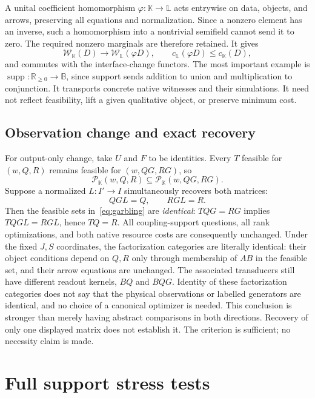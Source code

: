\documentclass[11pt]{article}
\newcommand{\K}{\mathbb K}
\newcommand{\B}{\mathbb B}
\newcommand{\R}{\mathbb R}
\newcommand{\supp}{\operatorname{supp}}
\newcommand{\W}{\mathcal W}
\newcommand{\Pcal}{\mathcal P}
\theoremstyle{remark}
\begin{document}
A unital coefficient homomorphism $\varphi:\K\to\mathbb L$ acts entrywise on data, objects, and arrows, preserving all equations and normalization. Since a nonzero element has an inverse, such a homomorphism into a nontrivial semifield cannot send it to zero. The required nonzero marginals are therefore retained. It gives
\[
 \W_\K(D)\longrightarrow\W_{\mathbb L}(\varphi D),
 \qquad c_{\mathbb L}(\varphi D)\le c_\K(D),
\]
and commutes with the interface-change functors. The most important example is $\supp:\R_{\ge0}\to\B$, since support sends addition to union and multiplication to conjunction. It transports concrete native witnesses and their simulations. It need not reflect feasibility, lift a given qualitative object, or preserve minimum cost.

\subsection{Observation change and exact recovery}

For output-only change, take $U$ and $F$ to be identities. Every $T$ feasible for $(w,Q,R)$ remains feasible for $(w,QG,RG)$, so
\begin{equation}\label{eq:garbling}
 \Pcal_\K(w,Q,R)\subseteq\Pcal_\K(w,QG,RG).
\end{equation}
Suppose a normalized $L:I'\to I$ simultaneously recovers both matrices:
\begin{equation}\label{eq:recovery}
 QGL=Q,\qquad RGL=R.
\end{equation}
Then the feasible sets in~\eqref{eq:garbling} are \emph{identical}: $TQG=RG$ implies $TQGL=RGL$, hence $TQ=R$. All coupling-support questions, all rank optimizations, and both native resource costs are consequently unchanged. Under the fixed $J,S$ coordinates, the factorization categories are literally identical: their object conditions depend on $Q,R$ only through membership of $AB$ in the feasible set, and their arrow equations are unchanged. The associated transducers still have different readout kernels, $BQ$ and $BQG$. Identity of these factorization categories does not say that the physical observations or labelled generators are identical, and no choice of a canonical optimizer is needed. This conclusion is stronger than merely having abstract comparisons in both directions. Recovery of only one displayed matrix does not establish it. The criterion is sufficient; no necessity claim is made.

\section{Full support stress tests}\label{sec:tests}
\end{document}

